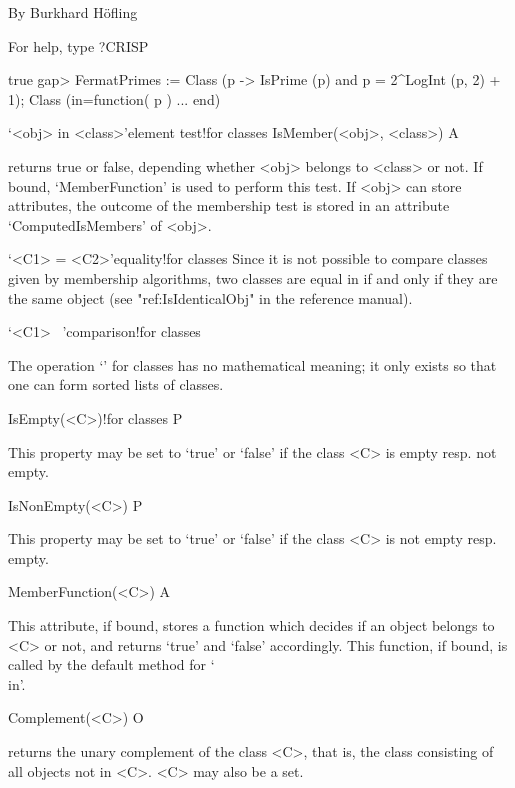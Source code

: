                By Burkhard H\"ofling               
                                                    
                For help, type ?CRISP               
                                                    
true
gap> FermatPrimes := Class (p -> IsPrime (p) and p = 2^LogInt (p, 2) + 1); 
Class (in=function( p ) ... end)
\endexample

\>`<obj> in <class>'{element test}!{for classes}
\>IsMember(<obj>, <class>) A

%
%
returns true or false, depending whether <obj> belongs to <class> or not. If
bound, `MemberFunction' is used to perform this test. If <obj> can store
attributes, the outcome of the membership test is stored in an attribute
`ComputedIsMembers' of <obj>.

\>`<C1> = <C2>'{equality!for classes}
Since it is not possible to compare classes given by membership algorithms,
two classes are equal in {\GAP} if and only if they are the same {\GAP}
object (see "ref:IsIdenticalObj" in the {\GAP} reference manual).

\>`<C1> \<\ <C2>'{comparison!for classes}

The operation `\<' for classes has no mathematical meaning; it only exists
so that one can form sorted lists of classes.



\>IsEmpty(<C>)!{for classes} P

This property may be set to `true' or `false' if the class <C> is empty
resp. not empty.

\>IsNonEmpty(<C>) P

This property may be set to `true' or `false' if the class <C> is not
empty resp. empty.

\>MemberFunction(<C>) A

This attribute, if bound, stores a function which decides if an object
belongs to <C> or not, and returns `true' and `false' accordingly. This
function, if bound, is called by the default method for `\\in'.


\>Complement(<C>) O

returns the unary complement of the class <C>, that is, the class consisting
of all objects not in <C>. <C> may also be a set.

